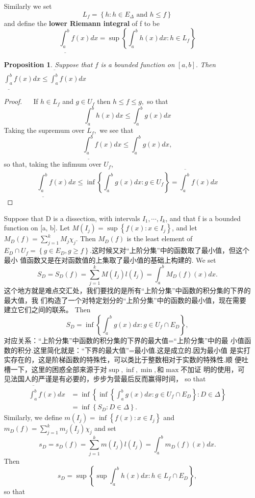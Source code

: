 \documentclass[12pt]{book}
\theoremstyle{definition}\newtheorem{dfn}{Définition}[chapter]
\theoremstyle{plain}\newtheorem{thm}{Théorème}[chapter]
\theoremstyle{plain}\newtheorem{prp}{Proposition}[chapter]
\theoremstyle{plain}\newtheorem{lem}{\bf Lemme}[chapter]
\theoremstyle{plain}\newtheorem{axm}{\bf Axiome}[chapter]
\theoremstyle{plain}\newtheorem{lmm}{\bf Lemme}[chapter]
\theoremstyle{plain}\newtheorem{exm}{\bf Example}[chapter]
\theoremstyle{plain}\newtheorem{cor}{\bf Corollaire}[chapter]
\theoremstyle{remark}\newtheorem{rem}{Remarque}[chapter]
\begin{document}
Similarly we set
$$L_f = \left\{h : h \in E_{\Delta}\text{ and }h \le f\right\}$$
and define the {\bf lower Riemann integral} of f to be
$$
\underline{\int^b_a}f(x)d x=\sup\left\{\int^b_a h(x) dx : h \in L_f\right\}
$$
\begin{prp}
Suppose that $f$ is a bounded function on $[a, b] .$ Then $\underline{\int_{a}^{b}} f(x) d x \leq \overline{\int_{a}^{b}} f(x) d x$
\end{prp}
\begin{proof}
$\quad$ If $h \in L_{f}$ and $g \in U_{f}$ then $h \leq f \leq g,$ so that
$$
\int_{a}^{b} h(x) d x \leq \int_{a}^{b} g(x) d x
$$
Taking the supremum over $L_{f},$ we see that
$$
\underline{\int_{a}^{b}} f(x) d x \leq \int_{a}^{b} g(x) d x,
$$
so that, taking the infimum over $U_{f}$,
$$
\underline{\int_{a}^{b}} f(x) d x \leq \inf \left\{\int_{a}^{b} g(x) d x: g \in U_{f}\right\}=\overline{\int_{a}^{b}} f(x) d x
$$
\end{proof}
Suppose that D is a dissection, with intervals $I_1, \cdots , I_k$, and that f is
a bounded function on [a, b]. Let $M(I_j) =\sup\left\{f(x) : x \in I_j\right\}$, and let
$M_D(f) = \sum^k_{j=1} M_j\chi_j$. Then $M_D(f)$ is the least element of $E_D \cap U_f =\left\{g \in
E_D, g \ge f\right\}$.这时候又对“上阶分集”中的函数取了最小值，但这个最小
值函数又是在对函数值的上集取了最小值的基础上构建的. We set
$$S_D = S_D(f) =\sum^k_{j=1}M(I_j)l(I_j) =\int^b_aM_D(f)(x) d x.$$
这个地方就是难点交汇处，我们要找的是所有“上阶分集”中函数的积分集的下界的最大值，我
们构造了一个对特定划分的“上阶分集”中的函数的最小值，现在需要建立它们之间的联系。
Then $$S_D = \inf\left\{\int^b_a g(x) dx : g \in U_f \cap E_D\right\},$$
对应关系：“上阶分集”中函数的积分集的下界的最大值=“上阶分集”中的最
小值函数的积分.这里简化就是：“下界的最大值”=最小值.这是成立的.因为最小值
是实打实存在的，这是阶梯函数的特殊性，可以类比于整数相对于实数的特殊性.顺
便吐槽一下，这里的困惑全部来源于对$\sup,$$\inf,$$\min,$和$\max$不加证
明的使用，可见法国人的严谨是有必要的，步步为营最后反而赢得时间，
so that
$$\begin{aligned}
\overline{\int^b_a}f(x) dx &=\inf\left\{\inf\left\{
\int^b_ag(x) dx : g \in U_f \cap E_D\right\} : D \in \Delta\right\}\\
&=\inf\left\{S_D : D \in \Delta\right\}.
\end{aligned}$$
Similarly, we define $m(I_j) =\inf\left\{f(x) : x \in I_j\right\}$ and
$m_D(f) = \sum^k_{j=1} m_j(I_j)\chi_j$
and set $$s_D = s_D(f) =\sum^k_{j=1}m(I_j)l(I_j) =\int^b_am_D(f)(x) d x.$$
Then $$s_D = \sup\left\{\sup\int^b_a h(x) dx : h \in L_f \cap E_D\right\},$$ so that
\end{document}
